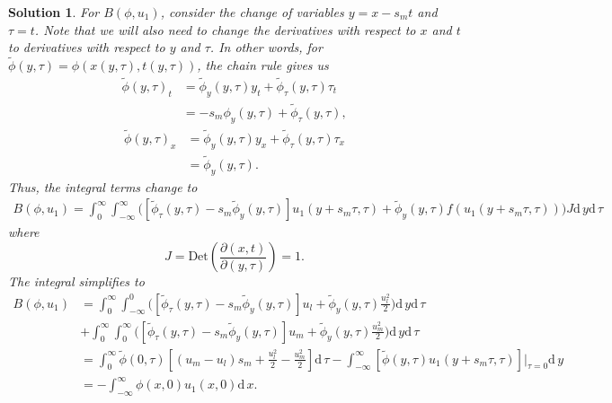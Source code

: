 \documentclass[10pt,letterpaper]{article}
\newcommand{\dif}[1][]{\mathrm{d} {#1}\,}
\newcommand{\frb}[1]{ \left(  {#1} \right) }
\theoremstyle{break}
\newtheorem{solution}{Solution}
\begin{document}
\begin{solution}
	For $B\frb{\phi,u_1}$, consider the change of variables $y = x - s_mt$ and $\tau = t$. Note that we will also need to change the derivatives with respect to $x$ and $t$ to derivatives with respect to $y$ and $\tau$. In other words, for $\widetilde \phi(y,\tau) = \phi(x(y,\tau),t(y,\tau))$, the chain rule gives us
	\begin{align*}
		\widetilde \phi(y,\tau)_t &=\widetilde \phi_y(y,\tau) y_t + \widetilde \phi_\tau(y,\tau) \tau_t\\
		&=
		-s_m \phi_y(y,\tau) + \widetilde \phi_\tau(y,\tau),
	\end{align*}
	\begin{align*}
		\widetilde \phi(y,\tau)_x &=\widetilde \phi_y(y,\tau) y_x + \widetilde \phi_\tau(y,\tau) \tau_x\\
		&= \widetilde \phi_y(y,\tau).
	\end{align*}
	Thus, the integral terms change to
	\begin{gather}
		B\frb{\phi,u_1}=\int_0^\infty \int_{-\infty}^\infty
				\Big( \left[ \widetilde \phi_\tau(y,\tau) -s_m \widetilde \phi_y(y,\tau)\right] u_1\frb{y+s_m \tau, \tau} + \widetilde \phi_y(y,\tau)  f(u_1\frb{y+s_m \tau, \tau}) \Big)
			J \dif y\dif \tau\ 
	\end{gather}
	where
	\[
	J = \text{Det} \left( \frac{\partial(x,t)}{\partial(y,\tau)} \right) = 1.
	\]
	The integral simplifies to
	\begin{align} \label{Bsum1}
		B\frb{\phi,u_1}&=\int_0^\infty \int_{-\infty}^0
				\Big( \left[ \widetilde \phi_\tau(y,\tau) -s_m \widetilde \phi_y(y,\tau)\right] u_l + \widetilde \phi_y(y,\tau)  \frac{u_l^2}{2} \Big)
			 \dif y\dif \tau\  \\
			 & + \int_0^\infty \int_0^{\infty}
				\Big( \left[ \widetilde \phi_\tau(y,\tau) -s_m  \widetilde\phi_y(y,\tau)\right] u_m + \widetilde \phi_y(y,\tau)  \frac{u_m^2}{2} \Big)
			 \dif y\dif \tau\ \\
			 &= \int_0^\infty \widetilde \phi(0,\tau) \left[(u_m - u_l) s_m + \frac{u_l^2}{2} - \frac{u_m^2}{2} \right] \dif \tau - \int_{-\infty}^{\infty} \left[\widetilde \phi(y,\tau) u_1(y+s_m \tau,\tau) \right]\Big|_{\tau=0} \dif y\\
			 &= - \int_{-\infty}^{\infty} \phi(x,0) u_1(x,0) \dif x.
	\end{align}
	

\end{solution}
\end{document}
